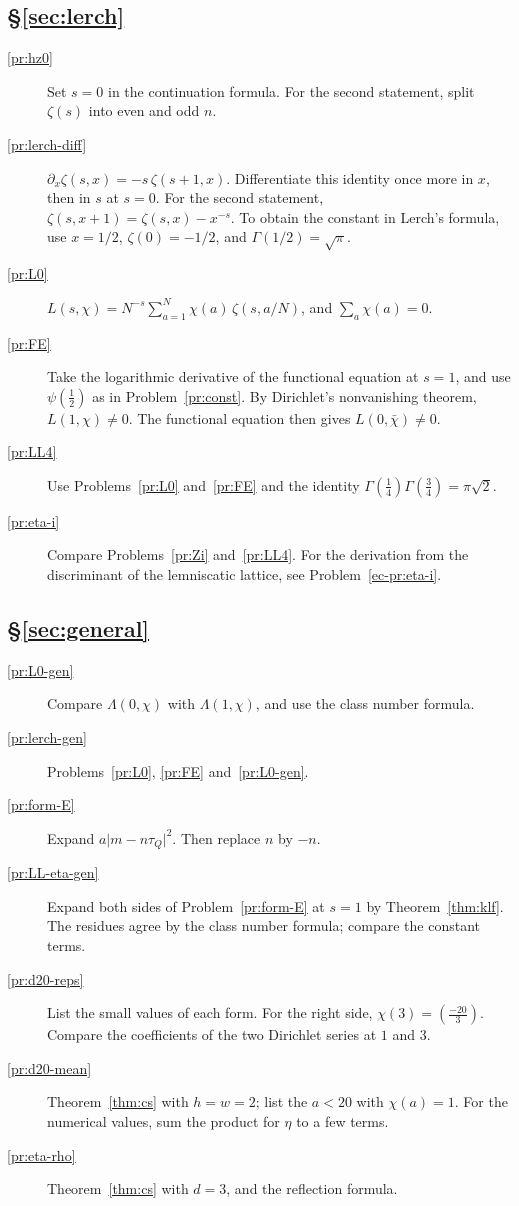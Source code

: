 \documentclass[reqno]{amsart}
\theoremstyle{definition}
\theoremstyle{plain}
\begin{document}
\subsection*{\S\ref{sec:lerch}}
\begin{description}
\item[\ref{pr:hz0}] Set \(s = 0\) in the continuation formula.  For the second statement, split \(\zeta(s)\) into even and odd \(n\).
\item[\ref{pr:lerch-diff}] \(\partial_x \zeta(s, x) = -s\, \zeta(s+1, x)\).  Differentiate this identity once more in \(x\), then in \(s\) at \(s=0\).  For the second statement, \(\zeta(s, x+1) = \zeta(s, x) - x^{-s}\).  To obtain the constant in Lerch's formula, use \(x=1/2\), \(\zeta(0)=-1/2\), and \(\Gamma(1/2)=\sqrt\pi\).
\item[\ref{pr:L0}] \(L(s, \chi) = N^{-s}\sum_{a=1}^{N} \chi(a)\, \zeta(s, a/N)\), and \(\sum_a \chi(a) = 0\).
\item[\ref{pr:FE}] Take the logarithmic derivative of the functional equation at \(s = 1\), and use \(\psi(\frac12)\) as in Problem~\ref{pr:const}.  By Dirichlet's nonvanishing theorem, \(L(1,\chi)\ne0\).  The functional equation then gives \(L(0,\bar\chi)\ne0\).
\item[\ref{pr:LL4}] Use Problems~\ref{pr:L0} and~\ref{pr:FE} and the identity \(\Gamma(\frac14)\Gamma(\frac34)=\pi\sqrt2\).
\item[\ref{pr:eta-i}] Compare Problems~\ref{pr:Zi} and~\ref{pr:LL4}.  For the derivation from the discriminant of the lemniscatic lattice, see Problem~\ref{ec-pr:eta-i}.
\end{description}

\subsection*{\S\ref{sec:general}}
\begin{description}
\item[\ref{pr:L0-gen}] Compare \(\Lambda(0, \chi)\) with \(\Lambda(1, \chi)\), and use the class number formula.
\item[\ref{pr:lerch-gen}] Problems~\ref{pr:L0}, \ref{pr:FE} and~\ref{pr:L0-gen}.
\item[\ref{pr:form-E}] Expand \(a\lvert m - n\tau_Q\rvert^2\).  Then replace \(n\) by \(-n\).
\item[\ref{pr:LL-eta-gen}] Expand both sides of Problem~\ref{pr:form-E} at \(s = 1\) by Theorem~\ref{thm:klf}.  The residues agree by the class number formula; compare the constant terms.
\item[\ref{pr:d20-reps}] List the small values of each form.  For the right side, \(\chi(3) = (\frac{-20}{3})\).  Compare the coefficients of the two Dirichlet series at \(1\) and \(3\).
\item[\ref{pr:d20-mean}] Theorem~\ref{thm:cs} with \(h = w = 2\); list the \(a < 20\) with \(\chi(a) = 1\).  For the numerical values, sum the product for \(\eta\) to a few terms.
\item[\ref{pr:eta-rho}] Theorem~\ref{thm:cs} with \(d = 3\), and the reflection formula.
\end{description}
\end{document}
